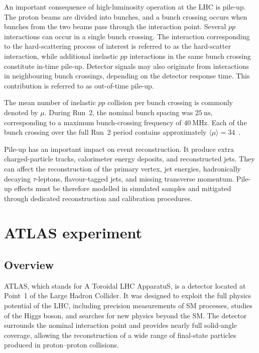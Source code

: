 An important consequence of high-luminosity operation at the LHC is pile-up.
The proton beams are divided into bunches, and a bunch crossing occurs when bunches from the two beams pass through the interaction point.
Several $pp$ interactions can occur in a single bunch crossing.
The interaction corresponding to the hard-scattering process of interest is referred to as the hard-scatter interaction, while additional inelastic $pp$ interactions in the same bunch crossing constitute in-time pile-up.
Detector signals may also originate from interactions in neighbouring bunch crossings, depending on the detector response time. This contribution is referred to as out-of-time pile-up.

The mean number of inelastic $pp$ collision per bunch crossing is commonly denoted by $\mu$.
During Run~2, the nominal bunch spacing was $25~\mathrm{ns}$, corresponding to a maximum bunch-crossing frequency of $40~\mathrm{MHz}$.
Each of the bunch crossing over the full Run~2 period contains approximately $\langle\mu\rangle=34$~\cite{ATLASPileupJER2024}.

Pile-up has an important impact on event reconstruction.
It produce extra charged-particle tracks, calorimeter energy deposits, and reconstructed jets.
They can affect the reconstruction of the primary vertex, jet energies, hadronically decaying $\tau$-leptons, flavour-tagged jets, and missing transverse momentum. Pile-up effects must be therefore modelled in simulated samples and mitigated through dedicated reconstruction and calibration procedures.


\section{ATLAS experiment}
\label{sec:atlas_experiment}

\subsection{Overview}
\label{subsec:atlas_overview}

ATLAS, which stands for A Toroidal LHC ApparatuS, is a detector located at Point~1 of the Large Hadron Collider.
It was designed to exploit the full physics potential of the LHC, including precision measurements of SM processes, studies of the Higgs boson, and searches for new physics beyond the SM.
The detector surrounds the nominal interaction point and provides nearly full solid-angle coverage, allowing the reconstruction of a wide range of final-state particles produced in proton--proton collisions.

